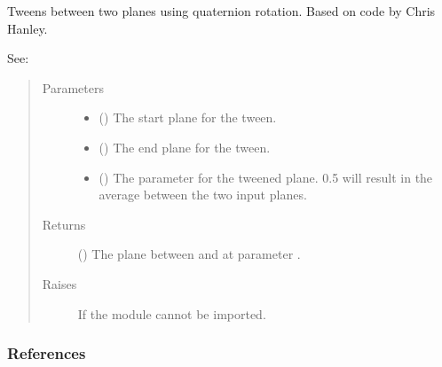 \documentclass[letterpaper,10pt,english]{sphinxmanual}
\begin{document}
\begin{fulllineitems}
\label{\detokenize{cockatoo:cockatoo.utilities.tween_planes}}
Tweens between two planes using quaternion rotation.
Based on code by Chris Hanley. %
\begin{footnote}[19]\sphinxAtStartFootnote
{}

See: 
%
\end{footnote}
\begin{quote}\begin{description}
\item[{Parameters}] \leavevmode\begin{itemize}
\item {} 
 () \textendash{} The start plane for the tween.

\item {} 
 () \textendash{} The end plane for the tween.

\item {} 
 () \textendash{} The parameter for the tweened plane. 0.5 will result in the average
between the two input planes.

\end{itemize}

\item[{Returns}] \leavevmode
{} () \textendash{} The plane between  and  at parameter .

\item[{Raises}] \leavevmode
{\hyperref[\detokenize{cockatoo:cockatoo.exception.SystemNotPresentError}]{}} \textendash{} If the  module cannot be imported.

\end{description}\end{quote}
\subsubsection*{References}

\end{fulllineitems}
\end{document}
